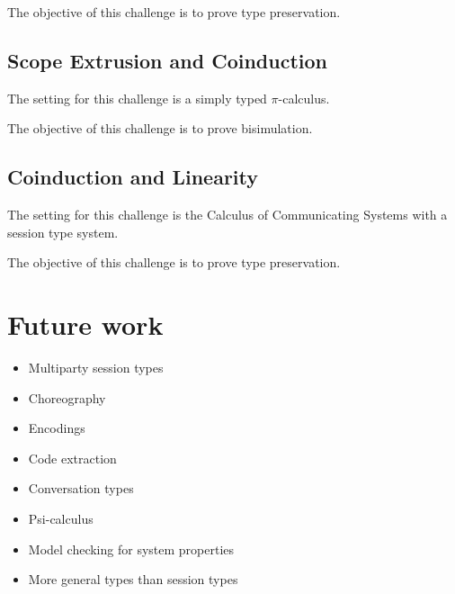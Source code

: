 \documentclass[a4paper]{article}
\begin{document}
The objective of this challenge is to prove type preservation.

\subsection{Scope Extrusion and Coinduction}
The setting for this challenge is a simply typed \( \pi \)-calculus.

The objective of this challenge is to prove bisimulation.

\subsection{Coinduction and Linearity}
The setting for this challenge is the Calculus of Communicating Systems with a session type system.

The objective of this challenge is to prove type preservation.

\section{Future work}
\begin{itemize}
\item Multiparty session types
\item Choreography
\item Encodings
\item Code extraction
\item Conversation types
\item Psi-calculus
\item Model checking for system properties
\item More general types than session types
\end{itemize}
\end{document}
